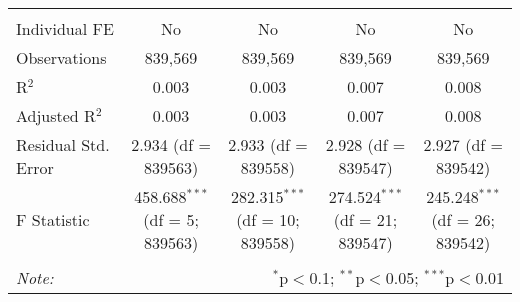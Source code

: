 \documentclass[
]{article}
\begin{document}
\begin{table}[!htbp]
{\begin{tabular}{@{\extracolsep{5pt}}lcccc}
  & & & & \\ 
\hline \\[-1.8ex] 
Individual FE & No & No & No & No \\ 
Observations & 839,569 & 839,569 & 839,569 & 839,569 \\ 
R$^{2}$ & 0.003 & 0.003 & 0.007 & 0.008 \\ 
Adjusted R$^{2}$ & 0.003 & 0.003 & 0.007 & 0.008 \\ 
Residual Std. Error & 2.934 (df = 839563) & 2.933 (df = 839558) & 2.928 (df = 839547) & 2.927 (df = 839542) \\ 
F Statistic & 458.688$^{***}$ (df = 5; 839563) & 282.315$^{***}$ (df = 10; 839558) & 274.524$^{***}$ (df = 21; 839547) & 245.248$^{***}$ (df = 26; 839542) \\ 
\hline 
\hline \\[-1.8ex] 
\textit{Note:}  & \multicolumn{4}{r}{$^{*}$p$<$0.1; $^{**}$p$<$0.05; $^{***}$p$<$0.01} \\ 
\end{tabular}
} 
\end{table} 
\newpage
\end{document}
